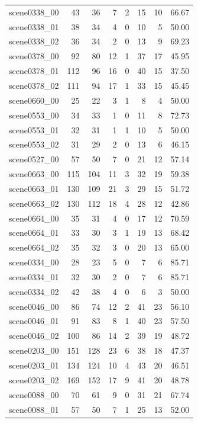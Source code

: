 \begin{table}[t]
\begin{tabular}{lrrrrrrr}
scene0338\_00 & 43 & 36 & 7 & 2 & 15 & 10 & 66.67 \\
scene0338\_01 & 38 & 34 & 4 & 0 & 10 & 5 & 50.00 \\
scene0338\_02 & 36 & 34 & 2 & 0 & 13 & 9 & 69.23 \\
scene0378\_00 & 92 & 80 & 12 & 1 & 37 & 17 & 45.95 \\
scene0378\_01 & 112 & 96 & 16 & 0 & 40 & 15 & 37.50 \\
scene0378\_02 & 111 & 94 & 17 & 1 & 33 & 15 & 45.45 \\
scene0660\_00 & 25 & 22 & 3 & 1 & 8 & 4 & 50.00 \\
scene0553\_00 & 34 & 33 & 1 & 0 & 11 & 8 & 72.73 \\
scene0553\_01 & 32 & 31 & 1 & 1 & 10 & 5 & 50.00 \\
scene0553\_02 & 31 & 29 & 2 & 0 & 13 & 6 & 46.15 \\
scene0527\_00 & 57 & 50 & 7 & 0 & 21 & 12 & 57.14 \\
scene0663\_00 & 115 & 104 & 11 & 3 & 32 & 19 & 59.38 \\
scene0663\_01 & 130 & 109 & 21 & 3 & 29 & 15 & 51.72 \\
scene0663\_02 & 130 & 112 & 18 & 4 & 28 & 12 & 42.86 \\
scene0664\_00 & 35 & 31 & 4 & 0 & 17 & 12 & 70.59 \\
scene0664\_01 & 33 & 30 & 3 & 1 & 19 & 13 & 68.42 \\
scene0664\_02 & 35 & 32 & 3 & 0 & 20 & 13 & 65.00 \\
scene0334\_00 & 28 & 23 & 5 & 0 & 7 & 6 & 85.71 \\
scene0334\_01 & 32 & 30 & 2 & 0 & 7 & 6 & 85.71 \\
scene0334\_02 & 42 & 38 & 4 & 0 & 6 & 3 & 50.00 \\
scene0046\_00 & 86 & 74 & 12 & 2 & 41 & 23 & 56.10 \\
scene0046\_01 & 91 & 83 & 8 & 1 & 40 & 23 & 57.50 \\
scene0046\_02 & 100 & 86 & 14 & 2 & 39 & 19 & 48.72 \\
scene0203\_00 & 151 & 128 & 23 & 6 & 38 & 18 & 47.37 \\
scene0203\_01 & 134 & 124 & 10 & 4 & 43 & 20 & 46.51 \\
scene0203\_02 & 169 & 152 & 17 & 9 & 41 & 20 & 48.78 \\
scene0088\_00 & 70 & 61 & 9 & 0 & 31 & 21 & 67.74 \\
scene0088\_01 & 57 & 50 & 7 & 1 & 25 & 13 & 52.00 \\

\end{tabular}
\end{table}

